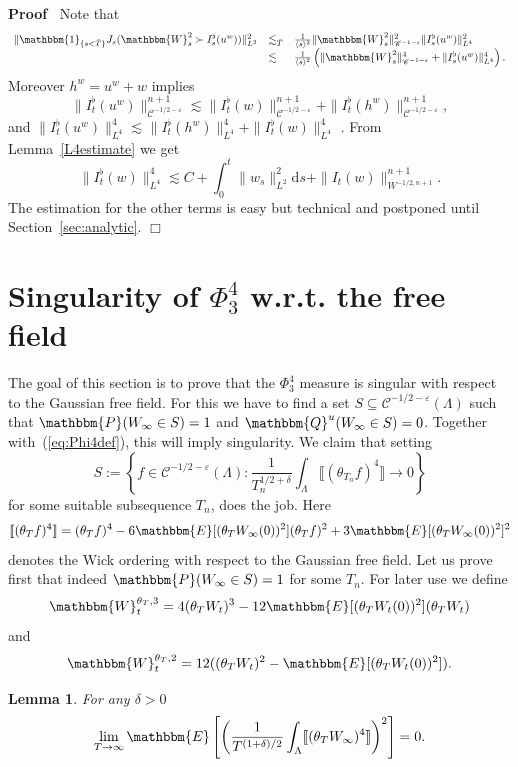 \documentclass[11pt]{article}
\newcommand{\assign}{:=}
\newcommand{\mathd}{\mathrm{d}}
\newenvironment{proof}{\noindent\textbf{Proof\ }}{\hspace*{\fill}$\Box$\medskip}
\newtheorem{lemma}{Lemma}
\newcommand{\VV}{\mathscr{C}}
\begin{document}
\begin{proof}
  Note that
  \[ \begin{array}{lll}
       \| \mathbbm{1}_{\{ s < \bar{T} \}} J_s (\mathbbm{W}_s^2 \succ
       I_s^{\flat} (u^w)) \|_{L^2}^2 & \lesssim_{\bar{T}} & \frac{1}{\langle s
       \rangle^2} \| \mathbbm{W}_s^2 \|^2_{\VV^{- 1 - \varepsilon}} \|
       I_s^{\flat} (u^w) \|^2_{L^4}\\
       & \lesssim & \frac{1}{\langle s \rangle^2} \left( \| \mathbbm{W}_s^2
       \|^4_{\VV^{- 1 - \varepsilon}} + \| I_s^{\flat} (u^w) \|^4_{L^4}
       \right) .
     \end{array} \]
  Moreover $h^w = u^w + w$ implies
  \[ \|I^{\flat}_t (u^w) \|^{n + 1}_{\VV^{- 1 / 2 - \varepsilon}} \lesssim
     \|I^{\flat}_t (w) \|^{n + 1}_{\VV^{- 1 / 2 - \varepsilon}} +
     \|I_t^{\flat} (h^w) \|^{n + 1}_{\VV^{- 1 / 2 - \varepsilon}}, \]
  and $\| I^{\flat}_t (u^w) \|^4_{L^4} \lesssim_{} \| I^{\flat}_t (h^w)
  \|^4_{L^4} + \| I^{\flat}_t (w) \|^4_{L^4}$ . From Lemma~\ref{L4estimate} we
  get
  \[ \| I^{\flat}_t (w) \|^4_{L^4} \lesssim C + \int^t_0 \| w_s \|_{L^2}^2
     \mathd s + \| I_t (w) \|^{n + 1}_{W^{- 1 / 2, n + 1}} . \]
  The estimation for the other terms is easy but technical and postponed until
  Section~\ref{sec:analytic}.
\end{proof}

\section{Singularity of $\Phi_3^4$ w.r.t. the free field}

The goal of this section is to prove that the $\Phi_3^4$ measure is singular
with respect to the Gaussian free field. For this we have to find a set $S
\subseteq \VV^{- 1 / 2 - \varepsilon} (\Lambda)$ such that $\mathbbm{P}
(W_{\infty} \in S) = 1$ and $\mathbbm{Q}^u (W_{\infty} \in S) = 0$. Together
with~(\ref{eq:Phi4def}), this will imply singularity. We claim that setting
\[ S \assign \left\{ f \in \VV^{- 1 / 2 - \varepsilon} (\Lambda) :
   \frac{1}{T_n^{1 / 2 + \delta}} \int_{\Lambda} \llbracket (\theta_{T_n} f)^4
   \rrbracket \rightarrow 0 \right\} \]
for some suitable subsequence $T_n$, does the job. Here
\[ \llbracket (\theta_T f)^4 \rrbracket = (\theta_T f)^4 - 6\mathbbm{E}
   [(\theta_T W_{\infty} (0))^2] (\theta_T f)^2 + 3\mathbbm{E} [(\theta_T
   W_{\infty} (0))^2]^2 \]
denotes the Wick ordering with respect to the Gaussian free field. Let us
prove first that indeed $\mathbbm{P} (W_{\infty} \in S) = 1$ for some $T_n$.
For later use we define
\[ \mathbbm{W}_t^{\theta_T, 3} = 4 (\theta_T W_t)^3 - 12\mathbbm{E} [(\theta_T
   W_t (0))^2] (\theta_T W_t) \]
and
\[ \mathbbm{W}_t^{\theta_T, 2} = 12 ((\theta_T W_t)^2 -\mathbbm{E} [(\theta_T
   W_t (0))^2]) . \]
\begin{lemma}
  For any $\delta > 0$
  \[ \lim_{T \rightarrow \infty} \mathbbm{E} \left[ \left( \frac{1}{T^{(1 +
     \delta) / 2}} \int_{\Lambda} \llbracket (\theta_T W_{\infty})^4
     \rrbracket \right)^2 \right] = 0. \]
\end{lemma}
\end{document}
